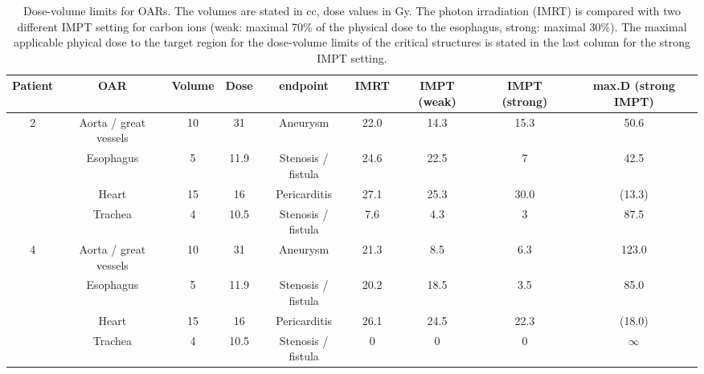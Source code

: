 \begin{table}[H]
\scriptsize
  \centering
  \caption{Dose-volume limits for OARs. The volumes are stated in cc, dose values in Gy. The photon irradiation (IMRT) is compared with two 
  different IMPT setting for carbon ions (weak: maximal 70\% of the physical dose to the esophagus, strong: maximal 30\%). The maximal 
  applicable phyical dose to the target region for the dose-volume limits of the critical structures is stated in the last column for the 
  strong IMPT setting.}
  \begin{tabular}{|c|c||c|c|c||c|c|c||c|}
    \hline\hline
    Patient & OAR & Volume & Dose & endpoint & IMRT & IMPT (weak) & IMPT (strong) & max.D (strong IMPT)\\
    \hline
    2 & Aorta / great vessels & 10 & 31 & Aneurysm & 22.0 & 14.3 & 15.3 & 50.6 \\
    & Esophagus & 5 & 11.9 &  Stenosis / fistula & 24.6 & 22.5 & 7 & 42.5 \\
    & Heart & 15 & 16 & Pericarditis & 27.1 & 25.3 & 30.0 & (13.3) \\
    & Trachea & 4 & 10.5 & Stenosis / fistula & 7.6 & 4.3 & 3 & 87.5 \\
    \hline
    4 & Aorta / great vessels & 10 & 31 & Aneurysm & 21.3 & 8.5 & 6.3 & 123.0 \\
    & Esophagus & 5 & 11.9 &  Stenosis / fistula & 20.2 & 18.5 & 3.5 & 85.0 \\
    & Heart & 15 & 16 & Pericarditis & 26.1 & 24.5 & 22.3 & (18.0) \\
    & Trachea & 4 & 10.5 & Stenosis / fistula & 0 & 0 & 0 & $\infty$\\  
    \hline\hline
  \end{tabular}
  \label{tab:dosevolume:photons:carbon}
\end{table}

\newpage


